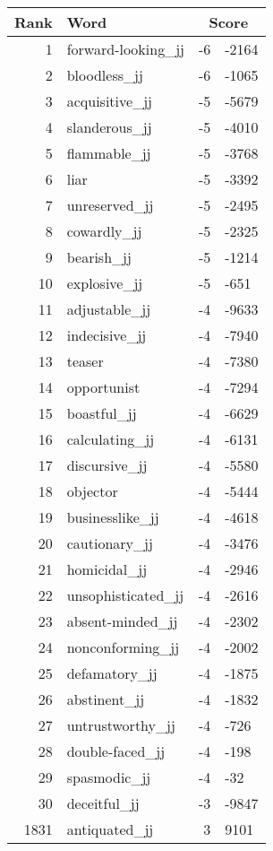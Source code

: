 \begin{longtable}[!htbp]{| rlr@{.}l |}
    \hline
    \textbf{Rank} & \textbf{Word} & \multicolumn{2}{c|}{\textbf{Score}} \\
    \hline
    \endhead
    1 & forward-looking\_jj & -6 & -2164 \\
    2 & bloodless\_jj & -6 & -1065 \\
    3 & acquisitive\_jj & -5 & -5679 \\
    4 & slanderous\_jj & -5 & -4010 \\
    5 & flammable\_jj & -5 & -3768 \\
    6 & liar & -5 & -3392 \\
    7 & unreserved\_jj & -5 & -2495 \\
    8 & cowardly\_jj & -5 & -2325 \\
    9 & bearish\_jj & -5 & -1214 \\
    10 & explosive\_jj & -5 & -651 \\
    11 & adjustable\_jj & -4 & -9633 \\
    12 & indecisive\_jj & -4 & -7940 \\
    13 & teaser & -4 & -7380 \\
    14 & opportunist & -4 & -7294 \\
    15 & boastful\_jj & -4 & -6629 \\
    16 & calculating\_jj & -4 & -6131 \\
    17 & discursive\_jj & -4 & -5580 \\
    18 & objector & -4 & -5444 \\
    19 & businesslike\_jj & -4 & -4618 \\
    20 & cautionary\_jj & -4 & -3476 \\
    21 & homicidal\_jj & -4 & -2946 \\
    22 & unsophisticated\_jj & -4 & -2616 \\
    23 & absent-minded\_jj & -4 & -2302 \\
    24 & nonconforming\_jj & -4 & -2002 \\
    25 & defamatory\_jj & -4 & -1875 \\
    26 & abstinent\_jj & -4 & -1832 \\
    27 & untrustworthy\_jj & -4 & -726 \\
    28 & double-faced\_jj & -4 & -198 \\
    29 & spasmodic\_jj & -4 & -32 \\
    30 & deceitful\_jj & -3 & -9847 \\
    1831 & antiquated\_jj & 3 & 9101 \\

\end{longtable}
